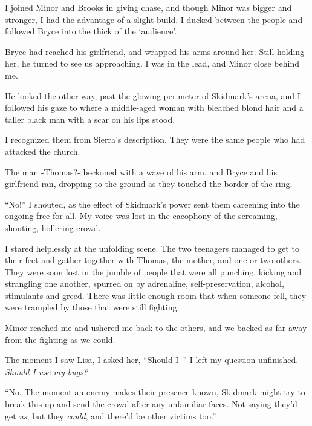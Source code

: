 I joined Minor and Brooks in giving chase, and though Minor was bigger and stronger, I had the advantage of a slight build.  I ducked between the people and followed Bryce into the thick of the `audience'.



Bryce had reached his girlfriend, and wrapped his arms around her.  Still holding her, he turned to see us approaching.  I was in the lead, and Minor close behind me.



He looked the other way, past the glowing perimeter of Skidmark's arena, and I followed his gaze to where a middle-aged woman with bleached blond hair and a taller black man with a scar on his lips stood.



I recognized them from Sierra's description.  They were the same people who had attacked the church.



The man -Thomas?- beckoned with a wave of his arm, and Bryce and his girlfriend ran, dropping to the ground as they touched the border of the ring.



``No!'' I shouted, as the effect of Skidmark's power sent them careening into the ongoing free-for-all.  My voice was lost in the cacophony of the screaming, shouting, hollering crowd.



I stared helplessly at the unfolding scene.  The two teenagers managed to get to their feet and gather together with Thomas, the mother, and one or two others.  They were soon lost in the jumble of people that were all punching, kicking and strangling one another, spurred on by adrenaline, self-preservation, alcohol, stimulants and greed.  There was little enough room that when someone fell, they were trampled by those that were still fighting.



Minor reached me and ushered me back to the others, and we backed as far away from the fighting as we could.



The moment I saw Lisa, I asked her, ``Should I--'' I left my question unfinished.  \emph{Should I use my bugs?}



``No.  The moment an enemy makes their presence known, Skidmark might try to break this up and send the crowd after any unfamiliar faces.  Not saying they'd get \emph{us}, but they \emph{could}, and there'd be other victims too.''



